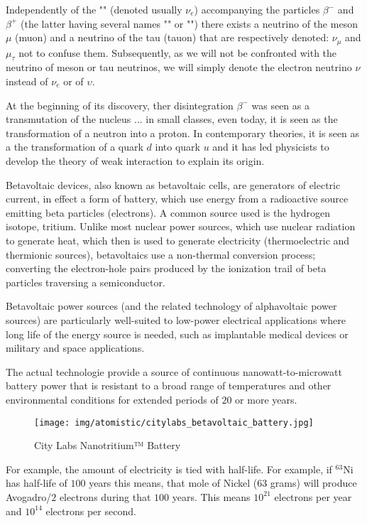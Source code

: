 	Independently of the "" (denoted usually $\nu_e$) accompanying the particles $\beta^{-}$ and $\beta^{+}$ (the latter having several names "" or "") there exists a neutrino of the meson $\mu$ (muon) and a neutrino of the tau (tauon) that are respectively denoted: $\nu_\mu$ and $\mu_\tau$ not to confuse them. Subsequently, as we will not be confronted with the neutrino of meson or tau neutrinos, we will simply denote the electron neutrino $\nu$ instead of $\nu_e$ or of $\upsilon$.
	\begin{tcolorbox}[title=Remark,colframe=black,arc=10pt]
	At the beginning of its discovery, ther disintegration $\beta^{-}$ was seen as a transmutation of the nucleus ... in small classes, even today, it is seen as the transformation of a neutron into a proton. In contemporary theories, it is seen as a the transformation of a quark $d$ into quark $u$ and it has led physicists to develop the theory of weak interaction to explain its origin.
	\end{tcolorbox}
	Betavoltaic devices, also known as betavoltaic cells, are generators of electric current, in effect a form of battery, which use energy from a radioactive source emitting beta particles (electrons). A common source used is the hydrogen isotope, tritium. Unlike most nuclear power sources, which use nuclear radiation to generate heat, which then is used to generate electricity (thermoelectric and thermionic sources), betavoltaics use a non-thermal conversion process; converting the electron-hole pairs produced by the ionization trail of beta particles traversing a semiconductor.
	
	Betavoltaic power sources (and the related technology of alphavoltaic power sources) are particularly well-suited to low-power electrical applications where long life of the energy source is needed, such as implantable medical devices or military and space applications.
	
	The actual technologie provide a source of continuous nanowatt-to-microwatt battery power that is resistant to a broad range of temperatures and other environmental conditions for extended periods of $20$ or more years.
	\begin{figure}[H]
		\centering
		\texttt{[image: img/atomistic/citylabs\_betavoltaic\_battery.jpg]}
		\caption{City Labs Nanotritium™ Battery}
	\end{figure}
	For example, the amount of electricity is tied with half-life. For example, if $^{63}\mathrm{Ni}$ has half-life of $100$ years this means, that mole of Nickel (63 grams) will produce Avogadro/$2$ electrons during that $100$ years. This means $10^{21}$ electrons per year and $10^{14}$ electrons per second.


